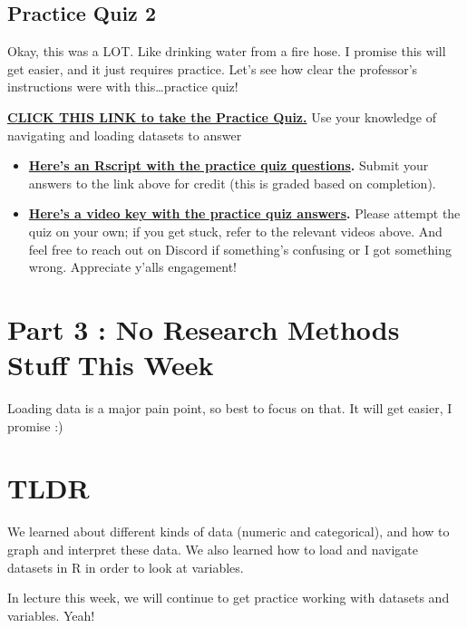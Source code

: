 \documentclass[
  letterpaper,
  DIV=11,
  numbers=noendperiod,
  oneside]{scrreprt}
\begin{document}
\section{Practice Quiz 2}\label{practice-quiz-2}

Okay, this was a LOT. Like drinking water from a fire hose. I promise
this will get easier, and it just requires practice. Let's see how clear
the professor's instructions were with this\ldots practice quiz!

\href{https://docs.google.com/forms/d/e/1FAIpQLSczCIkUMPcHX36bYbBpU4fH2Ei_U4neGsERl5WD8jTWRSxfiw/viewform?usp=sf_link}{\textbf{CLICK
THIS LINK to take the Practice Quiz.}} Use your knowledge of navigating
and loading datasets to answer~

\begin{itemize}
\item
  \href{https://www.dropbox.com/scl/fi/972y9dq8yan2l2q7cme5f/2.1_NavigatingData.R?rlkey=al8gff6iqxj0fdiy0mn8wiyp9&dl=0}{\textbf{Here's
  an Rscript with the practice quiz questions}}\textbf{.} Submit your
  answers to the link above for credit (this is graded based on
  completion).
\item
  \href{https://youtu.be/cfeogtcAhNM}{\textbf{Here's a video key with
  the practice quiz answers}}\textbf{.} Please attempt the quiz on your
  own; if you get stuck, refer to the relevant videos above. And feel
  free to reach out on Discord if something's confusing or I got
  something wrong. Appreciate y'alls engagement!
\end{itemize}

\chapter{Part 3 : No Research Methods Stuff This
Week}\label{part-3-no-research-methods-stuff-this-week}

Loading data is a major pain point, so best to focus on that. It will
get easier, I promise :)

\chapter{TLDR}\label{tldr}

We learned about different kinds of data (numeric and categorical), and
how to graph and interpret these data. We also learned how to load and
navigate datasets in R in order to look at variables.

In lecture this week, we will continue to get practice working with
datasets and variables. Yeah!
\end{document}
